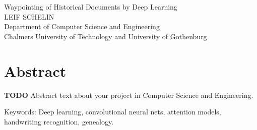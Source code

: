 
Waypointing of Historical Documents by Deep Learning\\
LEIF SCHELIN\\
Department of Computer Science and Engineering\\
Chalmers University of Technology and University of Gothenburg\setlength{\parskip}{0.5cm}

\thispagestyle{plain}			%
\setlength{\parskip}{0pt plus 1.0pt}
\section*{Abstract}
\textbf{TODO}
Abstract text about your project in  Computer Science and Engineering.

\vfill
Keywords: Deep learning, convolutional neural nets, attention models, handwriting recognition, genealogy.

\newpage				%
\thispagestyle{empty}
\mbox{}